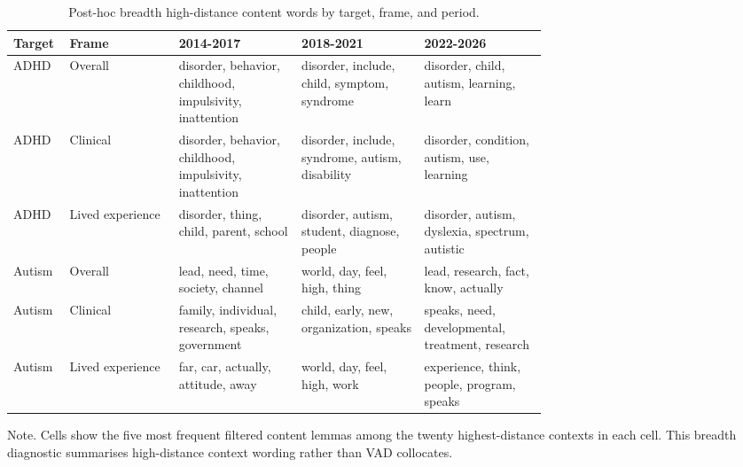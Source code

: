 \begin{table}[htbp]
\centering
\caption{Post-hoc breadth high-distance content words by target, frame, and period.}
\label{tab:lsc-posthoc-breadth-contributors}
\scriptsize
\setlength{\tabcolsep}{3.5pt}
\renewcommand{\arraystretch}{1.25}
\begin{tabular}{@{}llp{0.235\linewidth}p{0.235\linewidth}p{0.235\linewidth}@{}}
\toprule
Target & Frame & 2014-2017 & 2018-2021 & 2022-2026 \\
\midrule
ADHD & Overall & disorder, behavior, childhood, impulsivity, inattention & disorder, include, child, symptom, syndrome & disorder, child, autism, learning, learn \\
ADHD & Clinical & disorder, behavior, childhood, impulsivity, inattention & disorder, include, syndrome, autism, disability & disorder, condition, autism, use, learning \\
ADHD & Lived experience & disorder, thing, child, parent, school & disorder, autism, student, diagnose, people & disorder, autism, dyslexia, spectrum, autistic \\
Autism & Overall & lead, need, time, society, channel & world, day, feel, high, thing & lead, research, fact, know, actually \\
Autism & Clinical & family, individual, research, speaks, government & child, early, new, organization, speaks & speaks, need, developmental, treatment, research \\
Autism & Lived experience & far, car, actually, attitude, away & world, day, feel, high, work & experience, think, people, program, speaks \\
\bottomrule
\end{tabular}
\parbox{\linewidth}{\footnotesize Note. Cells show the five most frequent filtered content lemmas among the twenty highest-distance contexts in each cell. This breadth diagnostic summarises high-distance context wording rather than VAD collocates.}
\end{table}